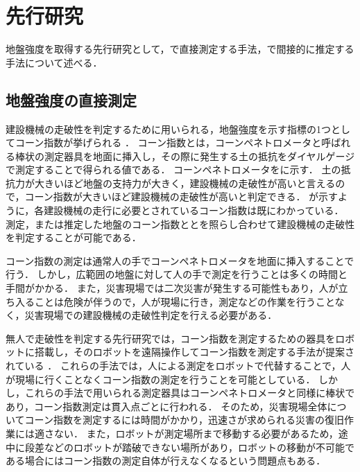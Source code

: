 \documentclass[../main]{subfiles}
\begin{document}
\graphicspath{{../figures/chap1/}}

\section{先行研究}
\label{sec:intro_previous-research}
地盤強度を取得する先行研究として，で直接測定する手法，で間接的に推定する手法について述べる．
\subsection{地盤強度の直接測定}
\label{subsec:intro_presearch_direct}
建設機械の走破性を判定するために用いられる，地盤強度を示す指標の1つとしてコーン指数が挙げられる ．
コーン指数とは，コーンペネトロメータと呼ばれる棒状の測定器具を地面に挿入し，その際に発生する土の抵抗をダイヤルゲージで測定することで得られる値である．
コーンペネトロメータをに示す．
土の抵抗力が大きいほど地盤の支持力が大きく，建設機械の走破性が高いと言えるので，コーン指数が大きいほど建設機械の走破性が高いと判定できる．
が示すように，各建設機械の走行に必要とされているコーン指数は既にわかっている．
測定，または推定した地盤のコーン指数ととを照らし合わせて建設機械の走破性を判定することが可能である．

コーン指数の測定は通常人の手でコーンペネトロメータを地面に挿入することで行う．
しかし，広範囲の地盤に対して人の手で測定を行うことは多くの時間と手間がかかる．
また，災害現場では二次災害が発生する可能性もあり，人が立ち入ることは危険が伴うので，人が現場に行き，測定などの作業を行うことなく，災害現場での建設機械の走破性判定を行える必要がある．

無人で走破性を判定する先行研究では，コーン指数を測定するための器具をロボットに搭載し，そのロボットを遠隔操作してコーン指数を測定する手法が提案されている  ．
これらの手法では，人による測定をロボットで代替することで，人が現場に行くことなくコーン指数の測定を行うことを可能としている．
しかし，これらの手法で用いられる測定器具はコーンペネトロメータと同様に棒状であり，コーン指数測定は貫入点ごとに行われる．
そのため，災害現場全体についてコーン指数を測定するには時間がかかり，迅速さが求められる災害の復旧作業には適さない．
また，ロボットが測定場所まで移動する必要があるため，途中に段差などのロボットが踏破できない場所があり，ロボットの移動が不可能である場合にはコーン指数の測定自体が行えなくなるという問題点もある．
\end{document}
